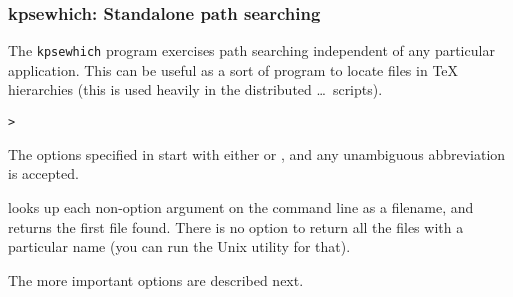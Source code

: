 \documentclass{article}
\begin{document}
\subsubsection{kpsewhich: Standalone path searching}
\label{Invoking-kpsewhich}

The \texttt{kpsewhich} program exercises path searching independent of any
particular application.  This can be useful as a sort of 
program to locate files in \TeX{} hierarchies (this is used heavily in
the distributed \dots\ scripts).

\begin{alltt}
> 
\end{alltt}
The options specified in  start with either \samp{-}
or \samp{-{}-}, and any unambiguous abbreviation is accepted.

\KPS{} looks up each non-option argument on the command line as a
filename, and returns the first file found. There is no option to
return all the files with a particular name (you can run the Unix
 utility for that).

The more important options are described next.
\end{document}
